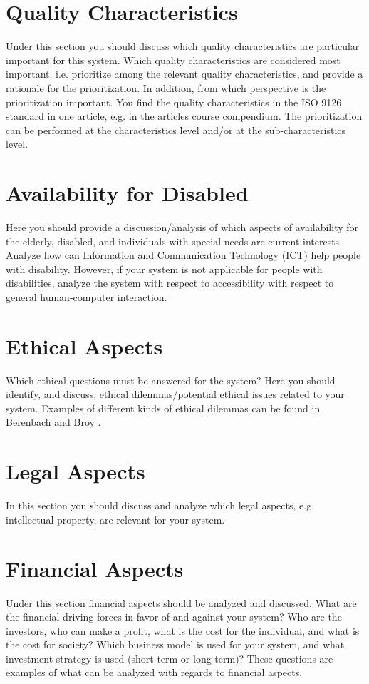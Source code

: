 \documentclass[conference]{IEEEtran}
\begin{document}
\section{Quality Characteristics}
Under this section you should discuss which quality characteristics are particular important for this system. Which quality characteristics are considered most important, i.e. prioritize among the relevant quality characteristics, and provide a rationale for the prioritization. In addition, from which perspective is the prioritization important. You find the quality characteristics in the ISO 9126 standard in one article, e.g. \cite{jung2004} in the articles course compendium. The prioritization can be performed at the characteristics level and/or at the sub-characteristics level.

\section{Availability for Disabled}
Here you should provide a discussion/analysis of which aspects of availability for the elderly, disabled, and individuals with special needs are current interests. Analyze how can Information and Communication Technology (ICT) help people with disability. However, if your system is not applicable for people with disabilities, analyze the system with respect to accessibility with respect to general human-computer interaction. 

\section{Ethical Aspects}
Which ethical questions must be answered for the system? Here you should identify, and discuss, ethical dilemmas/potential ethical issues related to your system. Examples of different kinds of ethical dilemmas can be found in Berenbach and Broy \cite{berenbach2004}.

\section{Legal Aspects}
In this section you should discuss and analyze which legal aspects, e.g. intellectual property, are relevant for your system.

\section{Financial Aspects}
Under this section financial aspects should be analyzed and discussed. What are the financial driving forces in favor of and against your system? Who are the investors, who can make a profit, what is the cost for the individual, and what is the cost for society? Which business model is used for your system, and what investment strategy is used (short-term or long-term)? These questions are examples of what can be analyzed with regards to financial aspects. 
\end{document}
